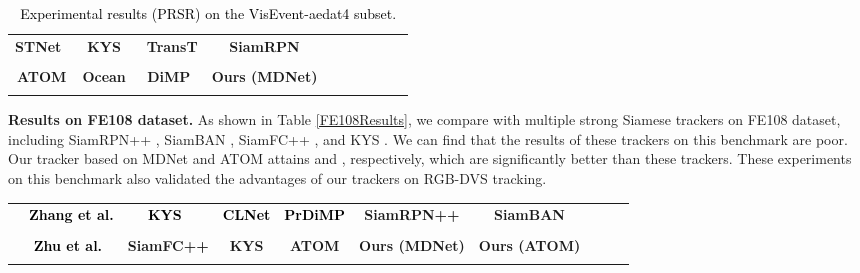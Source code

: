 \documentclass[journal]{IEEEtran}
\begin{document}
\begin{table}[!htp]
\center
\scriptsize      
\caption{\textcolor{black}{Experimental results (PRSR) on the VisEvent-aedat4 subset.}} 
\label{VisEventaedat4Results} 
\begin{tabular}{cccccccccc} 	 
\hline \toprule [0.5 pt]  
\textbf{STNet}~\cite{zhang2022STNet} 
&\textbf{KYS}~\cite{Goutam2020KYS} 
&\textbf{TransT} \cite{chen2021TransT} 
&\textbf{SiamRPN} \cite{li2018siamRPN}  \\ 
       
&     
&     
&     \\  
\hline 
\textbf{ATOM} \cite{danelljan2019atom} 	
&\textbf{Ocean}~\cite{zhang2020ocean}  
&\textbf{DiMP}~\cite{bhat2019DiMP}  
&\textbf{Ours (MDNet)} \\ 
\hline 
   
&      
&       
&       	 \\ 
\hline \toprule [0.5 pt]
\end{tabular}
\end{table} 



\textbf{ Results on FE108 dataset.}
As shown in Table \ref{FE108Results}, we compare with multiple strong Siamese trackers on FE108 dataset, including SiamRPN++ \cite{li2018siamrpn++}, SiamBAN \cite{chen2020siamban}, SiamFC++ \cite{xu2020siamfc++}, and KYS \cite{Goutam2020KYS}. We can find that the results of these trackers on this benchmark are poor. Our tracker based on MDNet and ATOM attains  and , respectively, which are significantly better than these trackers. These experiments on this benchmark also validated the advantages of our trackers on RGB-DVS tracking. 

\begin{table*}[!htp]
\center
\scriptsize      
\caption{Comparison on the FE108 dataset. The results of baseline trackers are borrowed from FE108 benchmark.} \label{FE108Results} 
\begin{tabular}{cccccccccc} 	 
\hline \toprule [0.5 pt]  
&\textcolor{black}{\textbf{Zhang et al.} \cite{Zhang2021FE108}}  
&\textcolor{black}{\textbf{KYS}}~\cite{Goutam2020KYS} 
&\textcolor{black}{\textbf{CLNet} \cite{dong2020clnet}} 
&\textcolor{black}{\textbf{PrDiMP} \cite{danelljan2020PRDiMP}}  
&\textbf{SiamRPN++} \cite{li2018siamrpn++} 			
&\textbf{SiamBAN} \cite{chen2020siamban} 	 \\ 
&\textcolor{black}{}       
&\textcolor{black}{}       
&\textcolor{black}{}        
&\textcolor{black}{}       
&  	
&  	 \\ 
\hline 
&\textcolor{black}{\textbf{Zhu et al.}}~\cite{zhu2022GrapheventTrack} &\textbf{SiamFC++} \cite{xu2020siamfc++} 	  &\textbf{KYS} \cite{Goutam2020KYS}	  	&\textbf{ATOM} \cite{danelljan2019atom}	    &\textbf{Ours (MDNet)}  	&\textbf{Ours (ATOM)}	  \\
&\textcolor{black}{}       & 		&  		& 		&   		& 					  		 \\
\hline \toprule [0.5 pt]
\end{tabular}
\end{table*} 
\end{document}
